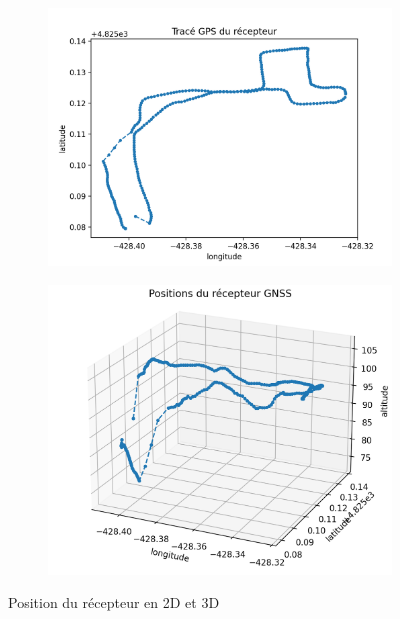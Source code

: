          \begin{figure}[h]
             \centering
             \begin{subfigure}[h]{.45\textwidth}
                \centering
                \includegraphics[width=\textwidth]{imgs/coords_2d}
             \end{subfigure}
             \hfill
             \begin{subfigure}[h]{.45\textwidth}
                \centering
                \includegraphics[width=\textwidth]{imgs/coords_3d}
             \end{subfigure}
             \caption{Position du récepteur en 2D et 3D}
             \label{fig:plot-coords}
         \end{figure}

